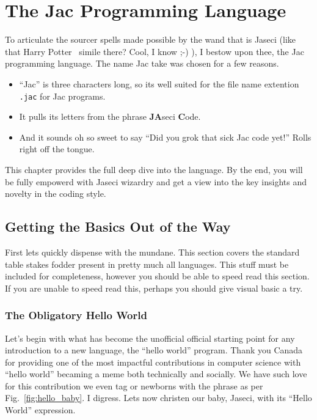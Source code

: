 \chapter{The Jac Programming Language}

To articulate the sourcer spells made possible by the wand that is Jaseci (like that Harry Potter~\cite{harrypotter} simile there? Cool, I know ;-) ), I bestow upon thee, the Jac programming language. The name Jac take was chosen for a few reasons.
\begin{itemize}
    \item ``Jac'' is three characters long, so its well suited for the file name extention \texttt{.jac} for Jac programs.
    \item It pulls its letters from the phrase \textbf{JA}seci \textbf{C}ode.
    \item And it sounds oh so sweet to say ``Did you \gls{grok} that \gls{sick} Jac code yet!'' Rolls right off the tongue.
\end{itemize}
\par
This chapter provides the full deep dive into the language. By the end, you will be fully empowerd with Jaseci wizardry and get a view into the key insights and novelty in the coding style.

\section{Getting the Basics Out of the Way}
First lets quickly dispense with the mundane. This section covers the standard table stakes fodder present in pretty much all languages. This stuff must be included for completeness, however you should be able to speed read this section.  If you are unable to speed read this, perhaps you should give visual basic a try.
\subsection{The Obligatory Hello World}\printfigHelloWorldBaby
Let's begin with what has become the unofficial official starting point for any introduction to a new language, the ``hello world'' program. Thank you Canada for providing one of the most impactful contributions in computer science with ``hello world'' becaming a meme both technically and socially. We have such love for this contribution we even tag or newborns with the phrase as per Fig.~\ref{fig:hello_baby}. I digress. Lets now \gls{christen} our baby, Jaseci, with its ``Hello World'' expression.

